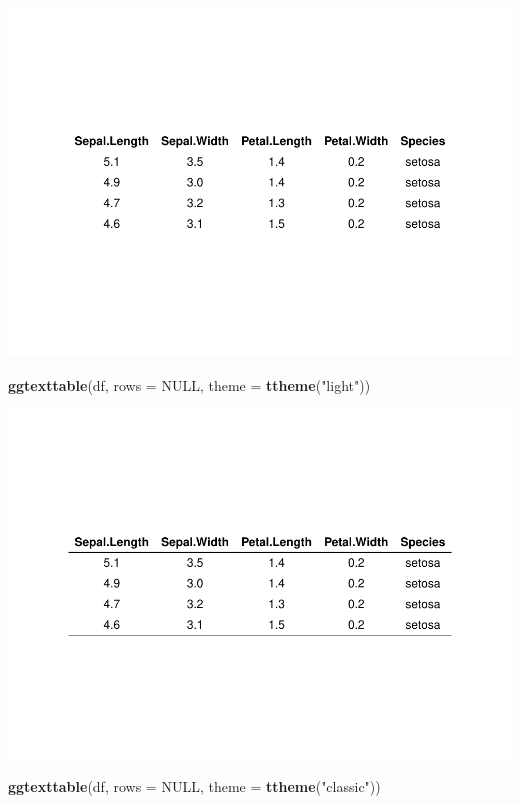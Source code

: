 \documentclass[
]{book}
\newenvironment{Shaded}{\begin{snugshade}}{\end{snugshade}}
\newcommand{\AttributeTok}[1]{\textcolor[rgb]{0.13,0.29,0.53}{#1}}
\newcommand{\ConstantTok}[1]{\textcolor[rgb]{0.56,0.35,0.01}{#1}}
\newcommand{\FunctionTok}[1]{\textcolor[rgb]{0.13,0.29,0.53}{\textbf{#1}}}
\newcommand{\NormalTok}[1]{#1}
\newcommand{\StringTok}[1]{\textcolor[rgb]{0.31,0.60,0.02}{#1}}
\begin{document}
\includegraphics{R_Manual_files/figure-latex/unnamed-chunk-232-1.pdf}

\begin{Shaded}
\begin{Highlighting}[]
\FunctionTok{ggtexttable}\NormalTok{(df, }\AttributeTok{rows =} \ConstantTok{NULL}\NormalTok{, }\AttributeTok{theme =} \FunctionTok{ttheme}\NormalTok{(}\StringTok{"light"}\NormalTok{))}
\end{Highlighting}
\end{Shaded}

\includegraphics{R_Manual_files/figure-latex/unnamed-chunk-232-2.pdf}

\begin{Shaded}
\begin{Highlighting}[]
\FunctionTok{ggtexttable}\NormalTok{(df, }\AttributeTok{rows =} \ConstantTok{NULL}\NormalTok{, }\AttributeTok{theme =} \FunctionTok{ttheme}\NormalTok{(}\StringTok{"classic"}\NormalTok{))}
\end{Highlighting}
\end{Shaded}
\end{document}
